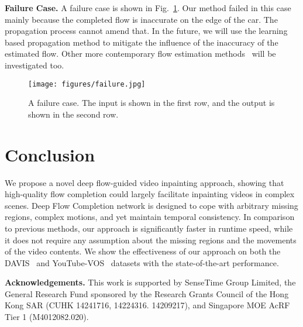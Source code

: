 \documentclass[10pt,twocolumn,letterpaper]{article}
\begin{document}
\noindent
\textbf{Failure Case.}
A failure case is shown in Fig.~\ref{fig:failure}. 
Our method failed in this case mainly because the completed flow is inaccurate on the edge of the car.
The propagation process cannot amend that.
In the future, we will use the learning based propagation method to mitigate the influence of the inaccuracy of the estimated flow. Other more contemporary flow estimation methods~\cite{hui2018liteflownet,hui2019lightweight,sun2018pwcnet} will be investigated too.

\begin{figure}[t]
	\centering
	\texttt{[image: figures/failure.jpg]}
	\vspace{-10pt}
	\caption{\small{A failure case. The input is shown in the first row, and the output is shown in the second row.}}
	\label{fig:failure}
	\vspace{-12pt}
\end{figure}



 


\section{Conclusion}


We propose a novel deep flow-guided video inpainting approach, showing that high-quality flow completion could largely facilitate inpainting videos in complex scenes. Deep Flow Completion network is designed to cope with arbitrary missing regions, complex motions, and yet maintain temporal consistency. In comparison to previous methods, our approach is significantly faster in runtime speed, while it does not require any assumption about the missing regions and the movements of the video contents. We show the effectiveness of our approach on both the DAVIS~\cite{Perazzi2016} and YouTube-VOS~\cite{xu2018youtube} datasets with the state-of-the-art performance.

\vspace{0.1cm}
\noindent
\textbf{Acknowledgements.}
This work is supported by SenseTime Group Limited, the General Research Fund sponsored by the Research Grants Council of the Hong Kong SAR (CUHK 14241716, 14224316. 14209217), and Singapore MOE AcRF Tier 1 (M4012082.020). 
\newpage

{\small


}
\end{document}
